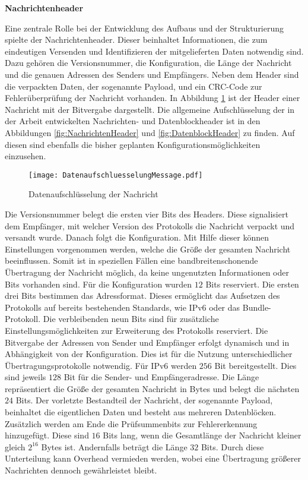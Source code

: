\label{sec:ProtokolDesign}

\textbf{Nachrichtenheader}

Eine zentrale Rolle bei der Entwicklung des Aufbaus und der Strukturierung
spielte der Nachrichtenheader.
Dieser beinhaltet Informationen, die zum eindeutigen Versenden und Identifizieren der
mitgelieferten Daten notwendig sind. Dazu gehören die Versionsnummer,
die Konfiguration, die Länge der Nachricht und die genauen Adressen
des Senders und Empfängers. Neben dem Header sind die verpackten Daten, der
sogenannte Payload, und ein CRC-Code zur Fehlerüberprüfung der Nachricht
vorhanden. In Abbildung \ref{fig:DatenaufschluesselungMessage} ist der Header
einer Nachricht mit der Bitvergabe dargestellt. Die allgemeine Aufschlüsselung
der in der Arbeit entwickelten Nachrichten- und Datenblockheader ist in den
Abbildungen \ref{fig:NachrichtenHeader} und \ref{fig:DatenblockHeader} zu
finden. Auf diesen sind ebenfalls die bisher geplanten
Konfigurationsmöglichkeiten einzusehen.

\begin{figure}[H]
	\centering
	\texttt{[image: DatenaufschluesselungMessage.pdf]}
	\caption{Datenaufschlüsselung der Nachricht}
	\label{fig:DatenaufschluesselungMessage}
\end{figure}

Die Versionsnummer belegt die ersten vier Bits des Headers. Diese
signalisiert dem Empfänger, mit welcher Version des Protokolls die Nachricht
verpackt und versandt wurde. Danach folgt die Konfiguration. Mit Hilfe dieser
können Einstellungen vorgenommen werden, welche die Größe der gesamten Nachricht
beeinflussen. Somit ist in speziellen Fällen eine bandbreitenschonende
Übertragung der Nachricht möglich, da keine ungenutzten Informationen oder Bits
vorhanden sind. Für die Konfiguration wurden $12$ Bits reserviert. Die ersten
drei Bits bestimmen das Adressformat. Dieses ermöglicht das Aufsetzen des
Protokolls auf bereits bestehenden Standards, wie IPv6 oder das Bundle-Protokoll.
Die verbleibenden neun Bits sind für zusätzliche Einstellungsmöglichkeiten zur
Erweiterung des Protokolls reserviert. Die Bitvergabe der Adressen von Sender
und Empfänger erfolgt dynamisch und in Abhängigkeit von der Konfiguration.
Dies ist für die Nutzung unterschiedlicher Übertragungsprotokolle notwendig.
Für IPv6 werden $256$ Bit bereitgestellt. Dies sind jeweils $128$ Bit für
die Sender- und Empfängeradresse. Die Länge repräsentiert die Größe der gesamten
Nachricht in Bytes und belegt die nächsten $24$ Bits.
Der vorletzte Bestandteil der Nachricht, der sogenannte Payload, beinhaltet die
eigentlichen Daten und besteht aus mehreren Datenblöcken. Zusätzlich werden am
Ende die Prüfsummenbits zur Fehlererkennung hinzugefügt. Diese sind $16$ Bits lang,
wenn die Gesamtlänge der Nachricht kleiner gleich $2^{16}$ Bytes ist.
Andernfalls beträgt die Länge $32$ Bits. Durch diese Unterteilung kann
Overhead vermieden werden, wobei eine {\"U}bertragung gr{\"o}{\ss}erer
Nachrichten dennoch gew{\"a}hrleistet bleibt.

